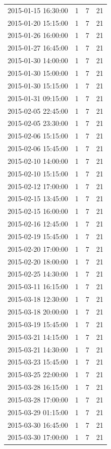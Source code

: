 \begin{tabular}{lrrr}
2015-01-15 16:30:00 & 1 & 7 & 21 \\
2015-01-20 15:15:00 & 1 & 7 & 21 \\
2015-01-26 16:00:00 & 1 & 7 & 21 \\
2015-01-27 16:45:00 & 1 & 7 & 21 \\
2015-01-30 14:00:00 & 1 & 7 & 21 \\
2015-01-30 15:00:00 & 1 & 7 & 21 \\
2015-01-30 15:15:00 & 1 & 7 & 21 \\
2015-01-31 09:15:00 & 1 & 7 & 21 \\
2015-02-05 22:45:00 & 1 & 7 & 21 \\
2015-02-05 23:30:00 & 1 & 7 & 21 \\
2015-02-06 15:15:00 & 1 & 7 & 21 \\
2015-02-06 15:45:00 & 1 & 7 & 21 \\
2015-02-10 14:00:00 & 1 & 7 & 21 \\
2015-02-10 15:15:00 & 1 & 7 & 21 \\
2015-02-12 17:00:00 & 1 & 7 & 21 \\
2015-02-15 13:45:00 & 1 & 7 & 21 \\
2015-02-15 16:00:00 & 1 & 7 & 21 \\
2015-02-16 12:45:00 & 1 & 7 & 21 \\
2015-02-19 15:45:00 & 1 & 7 & 21 \\
2015-02-20 17:00:00 & 1 & 7 & 21 \\
2015-02-20 18:00:00 & 1 & 7 & 21 \\
2015-02-25 14:30:00 & 1 & 7 & 21 \\
2015-03-11 16:15:00 & 1 & 7 & 21 \\
2015-03-18 12:30:00 & 1 & 7 & 21 \\
2015-03-18 20:00:00 & 1 & 7 & 21 \\
2015-03-19 15:45:00 & 1 & 7 & 21 \\
2015-03-21 14:15:00 & 1 & 7 & 21 \\
2015-03-21 14:30:00 & 1 & 7 & 21 \\
2015-03-23 15:45:00 & 1 & 7 & 21 \\
2015-03-25 22:00:00 & 1 & 7 & 21 \\
2015-03-28 16:15:00 & 1 & 7 & 21 \\
2015-03-28 17:00:00 & 1 & 7 & 21 \\
2015-03-29 01:15:00 & 1 & 7 & 21 \\
2015-03-30 16:45:00 & 1 & 7 & 21 \\
2015-03-30 17:00:00 & 1 & 7 & 21 \\

\end{tabular}
